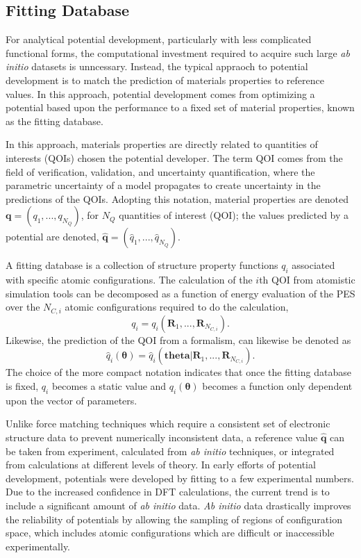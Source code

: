 \subsection{Fitting Database}

For analytical potential development, particularly with less complicated functional forms, the computational investment required to acquire such large \emph{ab initio} datasets is unncessary.  Instead, the typical appraoch to potential development is to match the prediction of materials properties to reference values.  In this approach,  potential development comes from optimizing a potential based upon the performance to a fixed set of material properties, known as the fitting database.

In this approach, materials properties are directly related to quantities of interests (QOIs) chosen the potential developer.  The term QOI comes from the field of verification, validation, and uncertainty quantification, where the parametric uncertainty of a model propagates to create uncertainty in the predictions of the QOIs.  Adopting this notation, material properties are denoted  $\bm{q} = ( q_{1},...,q_{N_Q} )$, for $N_Q$ quantities of interest (QOI); the values predicted by a potential are denoted, $\hat{\bm{q}}= (\hat{q}_{1},...,\hat{q}_{N_Q})$.

A fitting database is a collection of structure property functions $q_i$ associated with specific atomic configurations.	The calculation of the $i$th QOI from atomistic simulation tools can be decomposed as a function of energy evaluation of the PES over the $N_{C,i}$ atomic configurations required to do the calculation,
	\begin{equation}
		q_i = q_i(\bm{R}_1,...,\bm{R}_{N_{C,i}}).
	\end{equation}
Likewise, the prediction of the QOI from a formalism, can likewise be denoted as
	\begin{equation}
		\hat{q}_i(\bm{\theta}) = \hat{q}_i(\bm{theta}|\bm{R}_1,...,\bm{R}_{N_{C,i}}).
	\end{equation}
The choice of the more compact notation indicates that once the fitting database is fixed, $q_i$ becomes a static value and $\hat{q_i}(\bm{\theta})$ becomes a function only dependent upon the vector of parameters.

Unlike force matching techniques which require a consistent set of electronic structure data to prevent numerically inconsistent data\cite{behler2016_ml_pot}, a reference value $\hat{\bm{q}}$ can be taken from experiment, calculated from \emph{ab initio} techniques, or integrated from calculations at different levels of theory.  In early efforts of potential development, potentials were developed by fitting to a few experimental numbers.	Due to the increased confidence in DFT calculations, the current trend is to include a significant amount of \emph{ab initio} data.  \emph{Ab initio} data drastically improves the reliability of potentials by allowing the sampling of regions of configuration space, which includes atomic configurations which are difficult or inaccessible experimentally.

